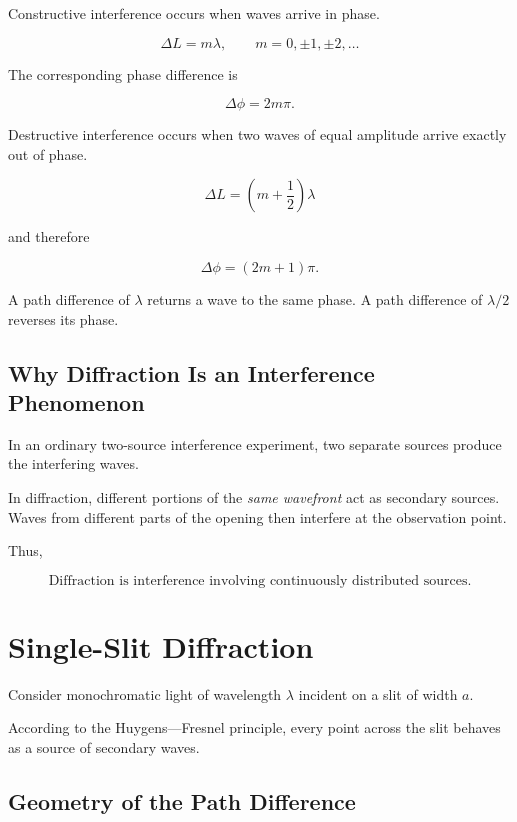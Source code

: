 \documentclass{studentnotes}
\begin{document}
Constructive interference occurs when waves arrive in phase.

\[
    \Delta L=m\lambda,
    \qquad
    m=0,\pm1,\pm2,\ldots
\]

The corresponding phase difference is

\[
    \Delta\phi=2m\pi.
\]

Destructive interference occurs when two waves of equal amplitude arrive exactly out of phase.

\[
    \Delta L=
    \left(m+\frac12\right)\lambda
\]

and therefore

\[
    \Delta\phi=(2m+1)\pi.
\]

\begin{quicknote}
    A path difference of \(\lambda\) returns a wave to the same phase. A path difference of \(\lambda/2\) reverses its phase.
\end{quicknote}

\subsection{Why Diffraction Is an Interference Phenomenon}

In an ordinary two-source interference experiment, two separate sources produce the interfering waves.

In diffraction, different portions of the \emph{same wavefront} act as secondary sources. Waves from different parts of the opening then interfere at the observation point.

Thus,

\[
    \boxed{
        \text{Diffraction is interference involving continuously distributed sources.}
    }
\]

\section{Single-Slit Diffraction}

Consider monochromatic light of wavelength \(\lambda\) incident on a slit of width \(a\).

According to the Huygens—Fresnel principle, every point across the slit behaves as a source of secondary waves.

\subsection{Geometry of the Path Difference}
\end{document}
